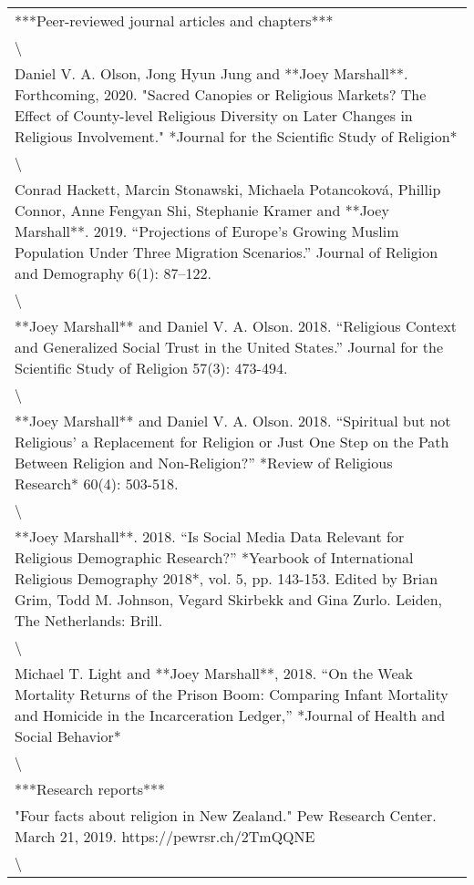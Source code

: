 \documentclass[
]{article}
\begin{document}
\begin{tabular}{l}
\hline
\\
\hline
***Peer-reviewed journal articles and chapters***\\
\hline
\textbackslash{}\\
\hline
Daniel V. A. Olson, Jong Hyun Jung and **Joey Marshall**. Forthcoming, 2020. "Sacred Canopies or Religious Markets? The Effect of County-level Religious Diversity on Later Changes in Religious Involvement." *Journal for the Scientific Study of Religion*\\
\hline
\textbackslash{}\\
\hline
Conrad Hackett, Marcin Stonawski, Michaela Potancoková, Phillip Connor, Anne Fengyan Shi, Stephanie Kramer and **Joey Marshall**. 2019. “Projections of
Europe’s Growing Muslim Population Under Three Migration Scenarios.” Journal of Religion and Demography 6(1): 87–122.\\
\hline
\textbackslash{}\\
\hline
**Joey Marshall** and Daniel V. A. Olson. 2018. “Religious Context and Generalized Social Trust in the United States.” Journal for the Scientific Study of Religion 57(3): 473-494.\\
\hline
\textbackslash{}\\
\hline
**Joey Marshall** and Daniel V. A. Olson. 2018. “Spiritual but not Religious' a Replacement for Religion or Just One Step on the Path Between Religion and Non-Religion?” *Review of Religious Research* 60(4): 503-518.\\
\hline
\textbackslash{}\\
\hline
**Joey Marshall**. 2018. “Is Social Media Data Relevant for Religious Demographic Research?” *Yearbook of International Religious Demography 2018*, vol. 5, pp. 143-153. Edited by Brian Grim, Todd M. Johnson, Vegard Skirbekk and Gina Zurlo. Leiden, The Netherlands: Brill.\\
\hline
\textbackslash{}\\
\hline
Michael T. Light and **Joey Marshall**, 2018. “On the Weak Mortality Returns of the Prison Boom: Comparing Infant Mortality and Homicide in the Incarceration Ledger,” *Journal of Health and Social Behavior*\\
\hline
\textbackslash{}\\
\hline
***Research reports***\\
\hline
"Four facts about religion in New Zealand." Pew Research Center. March 21, 2019. https://pewrsr.ch/2TmQQNE\\
\hline
\textbackslash{}\\

\end{tabular}
\end{document}
